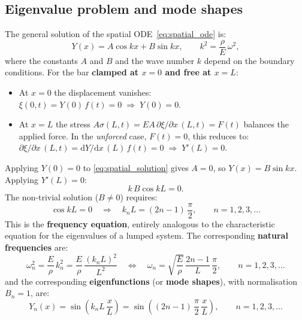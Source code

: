 \subsection{Eigenvalue problem and mode shapes}
\label{ssec:eigenproblem}

The general solution of the spatial ODE~\eqref{eq:spatial_ode} is:
\begin{equation}
  Y(x) = A\cos kx + B\sin kx,
  \qquad k^{2} = \frac{\rho}{E}\,\omega^{2},
  \label{eq:spatial_solution}
\end{equation}
where the constants $A$ and $B$ and the wave number $k$ depend on the boundary
conditions.  For the bar \textbf{clamped at $x = 0$ and free at $x = L$}:
\begin{itemize}[leftmargin=2em,itemsep=2pt]
  \item At $x=0$ the displacement vanishes:
    $\xi(0,t) = Y(0)\,f(t) = 0 \;\Rightarrow\; Y(0) = 0$.
  \item At $x=L$ the stress $A\sigma(L,t) = EA\,\partial\xi/\partial x\,(L,t) = F(t)$
    balances the applied force.  In the \emph{unforced} case, $F(t)=0$, this
    reduces to:
    $\partial\xi/\partial x\,(L,t) = \mathrm{d}Y/\mathrm{d}x\,(L)\,f(t) = 0
    \;\Rightarrow\; Y'(L) = 0$.
\end{itemize}

Applying $Y(0)=0$ to \eqref{eq:spatial_solution} gives $A=0$, so
$Y(x) = B\sin kx$.  Applying $Y'(L) = 0$:
\begin{equation}
  k\,B\cos kL = 0.
\end{equation}
The non-trivial solution ($B \neq 0$) requires:
\begin{equation}
  \cos kL = 0
  \quad\Longrightarrow\quad
  k_{n}L = (2n-1)\,\frac{\pi}{2},
  \qquad n = 1,2,3,\ldots
  \label{eq:freq_eq}
\end{equation}
This is the \textbf{frequency equation}, entirely analogous to the characteristic
equation for the eigenvalues of a lumped system.  The corresponding
\textbf{natural frequencies} are:
\begin{equation}
  \omega_{n}^{2} = \frac{E}{\rho}\,k_{n}^{2}
  = \frac{E}{\rho}\,\frac{(k_{n}L)^{2}}{L^{2}}
  \quad\Longleftrightarrow\quad
  \omega_{n} = \sqrt{\frac{E}{\rho}}\,\frac{2n-1}{L}\,\frac{\pi}{2},
  \qquad n = 1,2,3,\ldots
  \label{eq:natural_freq}
\end{equation}
and the corresponding \textbf{eigenfunctions} (or \textbf{mode shapes}), with
normalisation $B_{n}=1$, are:
\begin{equation}
  Y_{n}(x) = \sin\!\left(k_{n}L\,\frac{x}{L}\right)
  = \sin\!\left((2n-1)\,\frac{\pi}{2}\,\frac{x}{L}\right),
  \qquad n = 1,2,3,\ldots
  \label{eq:mode_shapes}
\end{equation}

